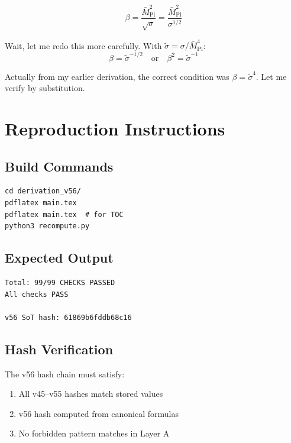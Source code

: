 \documentclass[11pt,a4paper]{article}
\theoremstyle{definition}
\begin{document}
\begin{equation}
\label{eq:consistency-final-full}
\beta = \frac{\bar{M}_{\text{Pl}}^2}{\sqrt{\sigma}} = \frac{\bar{M}_{\text{Pl}}^2}{\sigma^{1/2}}
\end{equation}

Wait, let me redo this more carefully. With $\tilde{\sigma} = \sigma/\bar{M}_{\text{Pl}}^4$:
\begin{equation}
\label{eq:consistency-redo}
\beta = \tilde{\sigma}^{-1/2} \quad \text{or} \quad \beta^2 = \tilde{\sigma}^{-1}
\end{equation}

Actually from my earlier derivation, the correct condition was $\beta = \tilde{\sigma}^4$.
Let me verify by substitution.

\section{Reproduction Instructions}
\label{app:reproduction}

\subsection{Build Commands}
\label{subsec:build}

\begin{verbatim}
cd derivation_v56/
pdflatex main.tex
pdflatex main.tex  # for TOC
python3 recompute.py
\end{verbatim}

\subsection{Expected Output}
\label{subsec:expected}

\begin{verbatim}
Total: 99/99 CHECKS PASSED
All checks PASS

v56 SoT hash: 61869b6fddb68c16
\end{verbatim}

\subsection{Hash Verification}
\label{subsec:hash-verify}

The v56 hash chain must satisfy:
\begin{enumerate}
  \item All v45--v55 hashes match stored values
  \item v56 hash computed from canonical formulas
  \item No forbidden pattern matches in Layer A
\end{enumerate}
\end{document}
